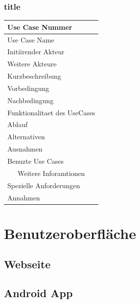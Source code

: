 \documentclass[10pt,a4paper]{article}
\begin{document}
\subsubsection{title}
		\begin{tabular}{|l|p{.5\linewidth}|}
		\hline Use Case Nummer &  \\ 
		\hline Use Case Name &  \\ 
		\hline Initiirender Akteur &  \\
		\hline Weitere Akteure &  \\
		\hline Kurzbeschreibung &  \\
		\hline Vorbedingung &  \\
		\hline Nachbedingung &  \\
		\hline \multicolumn{2}{|c|}{Funktionalitaet des UseCases}\\
		\hline Ablauf &  \\
		\hline Alternativen &  \\
		\hline Ausnahmen &  \\
		\hline Benuzte Use Cases &  \\
		\hline \multicolumn{2}{|c|}{Weitere Inforamtionen} \\
		\hline Spezielle Anforderungen &  \\
		\hline Annahmen &  \\
		\hline
		\end{tabular}





\section{Benutzeroberfl\"ache}
\subsection{Webseite}
\subsection{Android App}

\end{document}
